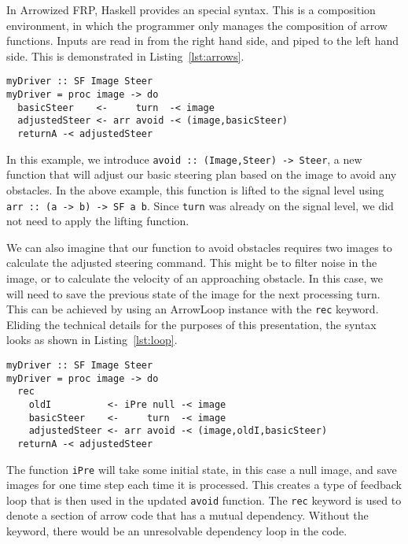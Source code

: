 In Arrowized FRP, Haskell provides an special syntax.
This is a composition environment, in which the programmer only manages the composition of arrow functions.
Inputs are read in from the right hand side, and piped to the left hand side.
This is demonstrated in Listing~\ref{lst:arrows}.

\begin{lstlisting}[float,floatplacement=h!,caption=Basic Arrowized FRP syntax,label=lst:arrows]
myDriver :: SF Image Steer
myDriver = proc image -> do
  basicSteer    <-     turn  -< image
  adjustedSteer <- arr avoid -< (image,basicSteer)
  returnA -< adjustedSteer
\end{lstlisting}

In this example, we introduce \texttt{avoid :: (Image,Steer) -> Steer}, a new function that will adjust our basic steering plan based on the image to avoid any obstacles.
In the above example, this function is lifted to the signal level using \texttt{arr :: (a -> b) -> SF a b}.
Since \texttt{turn} was already on the signal level, we did not need to apply the lifting function.

We can also imagine that our function to avoid obstacles requires two images to calculate the adjusted steering command.
This might be to filter noise in the image, or to calculate the velocity of an approaching obstacle.
In this case, we will need to save the previous state of the image for the next processing turn.
This can be achieved by using an ArrowLoop instance with the \texttt{rec} keyword.
Eliding the technical details for the purposes of this presentation, the syntax looks as shown in Listing~\ref{lst:loop}.

\begin{lstlisting}[float,caption=Using ArrowLoop to send feedback,label=lst:loop]
myDriver :: SF Image Steer
myDriver = proc image -> do
  rec
    oldI          <- iPre null -< image
    basicSteer    <-     turn  -< image
    adjustedSteer <- arr avoid -< (image,oldI,basicSteer)
  returnA -< adjustedSteer
\end{lstlisting}

The function \texttt{iPre} will take some initial state, in this case a null image, and save images for one time step each time it is processed.
This creates a type of feedback loop that is then used in the updated \texttt{avoid} function.
The \texttt{rec} keyword is used to denote a section of arrow code that has a mutual dependency.
Without the keyword, there would be an unresolvable dependency loop in the code.




